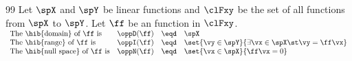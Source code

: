 \begin{example}
\citep{rudinf}{99}
\label{ex:op_null}
\label{ex:op_range}
\label{ex:op_domain}
Let $\spX$ and $\spY$ be linear functions
and $\clFxy$ be the set of all functions from $\spX$ to $\spY$.
Let $\ff$ be an function in $\clFxy$.
\\\indentx$\begin{array}{lrcl}
    \text{The \hib{domain} of $\ff$ is }
    & \oppD(\ff) &\eqd& \spX
    \\
    \text{The \hib{range} of $\ff$ is}
    & \oppI(\ff) &\eqd& \set{\vy\in\spY}{\exists \vx\in\spX \st \vy=\ff \vx }
    \\
    \text{The \hib{null space} of $\ff$ is}
    & \oppN(\ff) &\eqd& \set{\vx\in\spX}{\ff \vx=0}
  \end{array}$%
\end{example}

